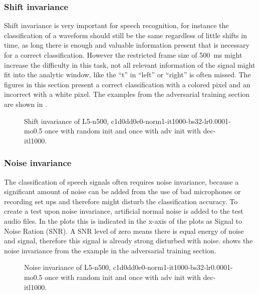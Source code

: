 \subsubsection{Shift invariance}
Shift invariance is very important for speech recognition, for instance the classification of a waveform should still be the same regardless of little shifts in time, as long there is enough and valuable information present that is necessary for a correct classification.
However the restricted frame size of \SI{500}{\milli\second} might increase the difficulty in this task, not all relevant information of the signal might fit into the analytic window, like the \enquote{t} in \enquote{left} or \enquote{right} is often missed.
The figures in this section present a correct classification with a colored pixel and an incorrect with a white pixel.
The examples from the adversarial training section are shown in .
\begin{figure}[!ht]
  \centering
  \caption{Shift invariance of L5-n500, c1d0dd0e0-norm1-it1000-bs32-lr0.0001-mo0.5 once with random init and once with adv init with dec-itl1000.}
  \label{fig:exp_tb_shift_fc3}
\end{figure}
\FloatBarrier
\noindent



\subsubsection{Noise invariance}
The classification of speech signals often requires noise invariance, because a significant amount of noise can be added from the use of bad microphones or recording set ups and therefore might disturb the classification accuracy.
To create a test upon noise invariance, artificial normal noise is added to the test audio files.
In the plots this is indicated in the x-axis of the plots as Signal to Noise Ration (SNR).
A SNR level of zero means there is equal energy of noise and signal, therefore this signal is already strong disturbed with noise.
 shows the noise invariance from the example in the adversarial training section.

\begin{figure}[!ht]
  \centering
  \caption{Noise invariance of L5-n500, c1d0dd0e0-norm1-it1000-bs32-lr0.0001-mo0.5 once with random init and once with adv init with dec-itl1000.}
  \label{fig:exp_tb_noise_fc3}
\end{figure}
\FloatBarrier
\noindent
